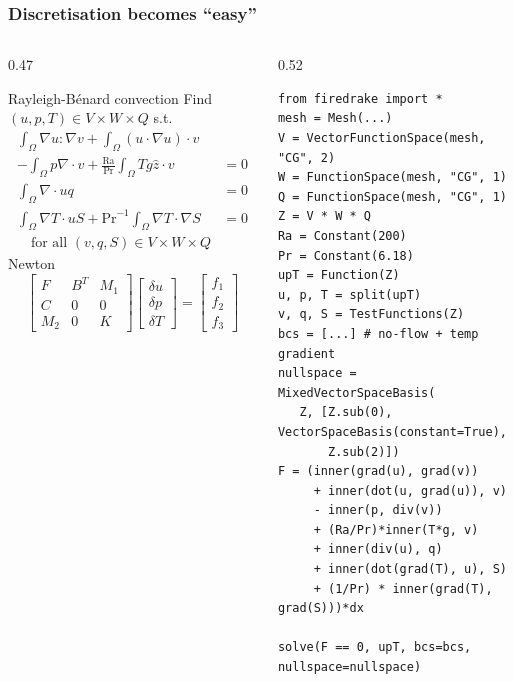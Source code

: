 \documentclass[presentation,aspectratio=43, 10pt]{beamer}
\begin{document}
\begin{frame}[fragile, t]
  \frametitle{Discretisation becomes ``easy''}
  \begin{columns}[T]
    \begin{column}{0.47\framewidth}
      \begin{block}{Rayleigh-B\'enard convection}      
        \footnotesize
        Find $(u, p, T) \in V\times W\times Q$ s.t.
        \begin{align*}
          \int_\Omega\nabla u : \nabla v + \int_\Omega (u \cdot \nabla u) \cdot v \\
          - \int_\Omega p \nabla\cdot v + \frac{\text{Ra}}{\text{Pr}}
          \int_\Omega Tg\hat{z} \cdot v &= 0 \\
          \int_\Omega \nabla\cdot u q &= 0\\
          \int_\Omega \nabla T \cdot u S
          + \text{Pr}^{-1} \int_\Omega \nabla T \cdot \nabla S &= 0\\
          \quad \text{for all } (v,q,S) \in V\times W \times Q
        \end{align*}      
        Newton
        \begin{equation*}
          \begin{bmatrix}
            F   & B^T & M_1 \\
            C   & 0   & 0   \\
            M_2 & 0 & K
          \end{bmatrix}
          \begin{bmatrix}
            \delta u \\
            \delta p \\
            \delta T
          \end{bmatrix} =
          \begin{bmatrix}
            f_1 \\
            f_2 \\
            f_3
          \end{bmatrix}
        \end{equation*}
      \end{block}
    \end{column}
    \begin{column}{0.52\framewidth}
\begin{verbatim}
from firedrake import *
mesh = Mesh(...)
V = VectorFunctionSpace(mesh, "CG", 2)
W = FunctionSpace(mesh, "CG", 1)
Q = FunctionSpace(mesh, "CG", 1)
Z = V * W * Q
Ra = Constant(200)
Pr = Constant(6.18)
upT = Function(Z)
u, p, T = split(upT)
v, q, S = TestFunctions(Z)
bcs = [...] # no-flow + temp gradient
nullspace = MixedVectorSpaceBasis(
   Z, [Z.sub(0), VectorSpaceBasis(constant=True),
       Z.sub(2)])
F = (inner(grad(u), grad(v))
     + inner(dot(u, grad(u)), v)
     - inner(p, div(v))
     + (Ra/Pr)*inner(T*g, v)
     + inner(div(u), q)
     + inner(dot(grad(T), u), S)
     + (1/Pr) * inner(grad(T), grad(S)))*dx

solve(F == 0, upT, bcs=bcs, nullspace=nullspace)
\end{verbatim}
    \end{column}
  \end{columns}
\end{frame}
\end{document}
